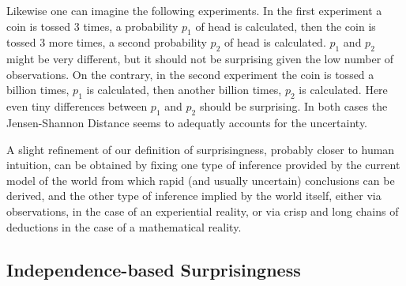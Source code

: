 \documentclass[runningheads]{llncs}
\begin{document}
Likewise one can imagine the following experiments. In the first
experiment a coin is tossed 3 times, a probability $p_1$ of head is
calculated, then the coin is tossed 3 more times, a second probability
$p_2$ of head is calculated. $p_1$ and $p_2$ might be very different,
but it should not be surprising given the low number of
observations. On the contrary, in the second experiment the coin is
tossed a billion times, $p_1$ is calculated, then another billion
times, $p_2$ is calculated. Here even tiny differences between $p_1$
and $p_2$ should be surprising. In both cases
the Jensen-Shannon Distance seems to adequatly accounts for the
uncertainty.

A slight refinement of our definition of surprisingness, probably
closer to human intuition, can be obtained by fixing one type of
inference provided by the current model of the world from which rapid
(and usually uncertain) conclusions can be derived, and the other type
of inference implied by the world itself, either via observations, in
the case of an experiential reality, or via crisp and long chains of
deductions in the case of a mathematical reality.

\subsection{Independence-based Surprisingness}
\label{IS}
\end{document}
